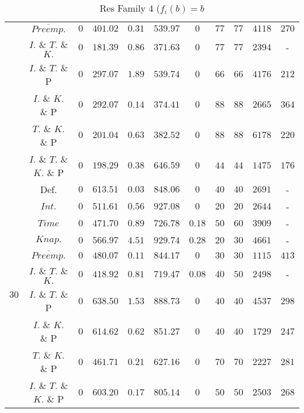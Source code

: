 \documentclass{article}
\begin{document}
\begin{table}[!htb]
{\begin{tabular}{|c|c|c|cc|cccccc|}
                             & $\overline{Preemp.}$&$0$ & $401.02$ & $0.31$ & $539.97$ & $0$ & $77$ & $77$ & $4118$ & $270 $ \\ 
                             & $I.$ \& $T.$ \& $K.$ &$0$ & $181.39$ & $0.86$ & $371.63$ & $0$ & $77$ & $77$ & $2394$ & - \\ 
                             & $I.$ \& $T.$ \& P & $0$ & $297.07$ & $1.89$ & $539.74$ & $0$ & $66$ & $66$ & $4176$ & $212 $ \\ 
                             & $I.$ \& $K.$ \& P &$0$ & $292.07$ & $0.14$ & $374.41$ & $0$ & $88$ & $88$ & $2665$ & $364 $ \\ 
                             & $T.$ \& $K.$ \& P & $0$ & $201.04$ & $0.63$ & $382.52$ & $0$ & $88$ & $88$ & $6178$ & $220 $ \\ 
                             & $I.$ \& $T.$ \& $K.$ \& P & $0$ & $198.29$ & $0.38$ & $646.59$ & $0$ & $44$ & $44$ & $1475$ & $176 $ \\ 
    \hline
    \multirow{10}{*}{30} &  Def. &$0$ & $613.51$ & $0.03$ & $848.06$ & $0$ & $40$ & $40$ & $2691$ & - \\ 
                             & $Int.$ & $0$ & $511.61$ & $0.56$ & $927.08$ & $0$ & $20$ & $20$ & $2644$ & - \\ 
                             & $Time$  & $0$ & $471.70$ & $0.89$ & $726.78$ & $0.18$ & $50$ & $60$ & $3909$ & - \\ 
                             & $Knap.$  & $0$ & $566.97$ & $4.51$ & $929.74$ & $0.28$ & $20$ & $30$ & $4661$ & - \\ 
                             & $\overline{Preemp.}$&$0$ & $480.07$ & $0.11$ & $844.17$ & $0$ & $30$ & $30$ & $1115$ & $413 $ \\ 
                             & $I.$ \& $T.$ \& $K.$ &$0$ & $418.92$ & $0.81$ & $719.47$ & $0.08$ & $40$ & $50$ & $2498$ & - \\ 
                             & $I.$ \& $T.$ \& P & $0$ & $638.50$ & $1.53$ & $888.73$ & $0$ & $40$ & $40$ & $4537$ & $298 $ \\ 
                             & $I.$ \& $K.$ \& P & $0$ & $614.62$ & $0.62$ & $851.27$ & $0$ & $40$ & $40$ & $1729$ & $247 $ \\ 
                             & $T.$ \& $K.$ \& P &$0$ & $461.71$ & $0.21$ & $627.16$ & $0$ & $70$ & $70$ & $2227$ & $281 $ \\ 
                             & $I.$ \& $T.$ \& $K.$ \& P & $0$ & $603.20$ & $0.17$ & $805.14$ & $0$ & $50$ & $50$ & $2503$ & $268 $ \\ 
    \hline
  \end{tabular}}
\caption{Res Family 4 ($f_i(b)=b$}
\end{table}
\end{document}
